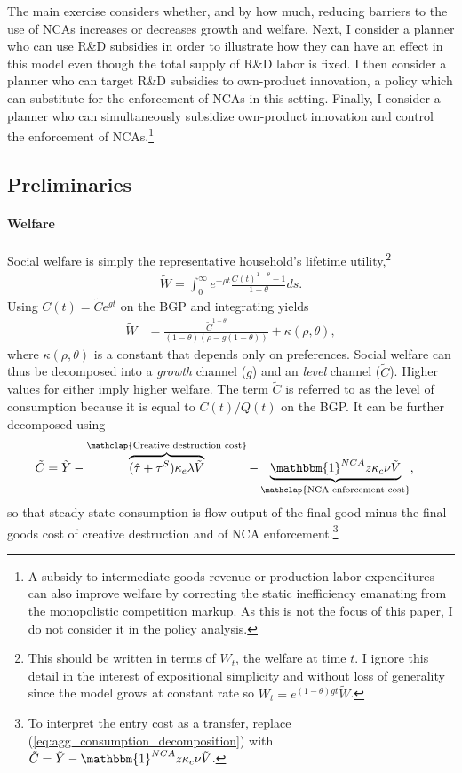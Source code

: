 \documentclass[ecta,nameyear,final]{econsocart}
\theoremstyle{plain}
\theoremstyle{remark}
\begin{document}
The main exercise considers whether, and by how much, reducing barriers to the use of NCAs increases or decreases growth and welfare.  Next, I consider a planner who can use R\&D subsidies in order to illustrate how they can have an effect in this model even though the total supply of R\&D labor is fixed. I then consider a planner who can target R\&D subsidies to own-product innovation, a policy which can substitute for the enforcement of NCAs in this setting. Finally, I consider a planner who can simultaneously subsidize own-product innovation and control the enforcement of NCAs.\footnote{A subsidy to intermediate goods revenue or production labor expenditures can also improve welfare by correcting the static inefficiency emanating from the monopolistic competition markup. As this is not the focus of this paper, I do not consider it in the policy analysis.}

\subsection{Preliminaries}

\paragraph{Welfare}

Social welfare is simply the representative household's lifetime utility,\footnote{This should be written in terms of $W_t$, the welfare at time $t$. I ignore this detail in the interest of expositional simplicity and without loss of generality since the model grows at constant rate so $W_t = e^{(1-\theta)gt}\tilde{W}$.} 
\begin{align}
	\tilde{W} = \int_0^{\infty} e^{-\rho t} \frac{C(t)^{1-\theta} - 1}{1-\theta} ds \label{eq:agg_welfare0}.
\end{align}
Using $C(t) = \tilde{C} e^{gt}$ on the BGP and integrating yields
\begin{align}
	\tilde{W} &= \frac{\tilde{C}^{1-\theta} }{(1-\theta)(\rho - g(1-\theta))} + \kappa(\rho,\theta), \label{eq:agg_welfare1}
\end{align}
where $\kappa(\rho,\theta)$ is a constant that depends only on preferences. Social welfare can thus be decomposed into a \textit{growth} channel ($g$) and an \textit{level} channel ($\tilde{C}$). Higher values for either imply higher welfare. The term $\tilde{C}$ is referred to as the level of consumption because it is equal to $C(t) / Q(t)$ on the BGP. It can be further decomposed using 
\begin{align}
	\tilde{C} &= \tilde{Y} - \overbrace{(\hat{\tau} + \tau^S) \kappa_e \lambda \tilde{V}}^{\mathclap{\text{Creative destruction cost}}} - \underbrace{\mathbbm{1}^{NCA} z \kappa_c \nu \tilde{V}}_{\mathclap{\text{NCA enforcement cost}}}, \label{eq:agg_consumption_decomposition}
\end{align}
so that steady-state consumption is flow output of the final good minus the final goods cost of creative destruction and of NCA enforcement.\footnote{To interpret the entry cost as a transfer, replace (\ref{eq:agg_consumption_decomposition}) with $\tilde{C} = \tilde{Y}- \mathbbm{1}^{NCA} z \kappa_c \nu \tilde{V}$.}
\end{document}
